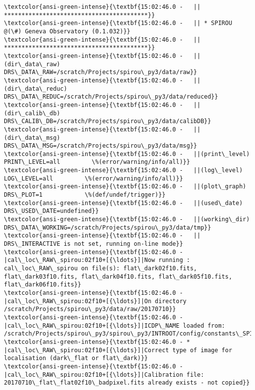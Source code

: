 \documentclass[11pt]{article}
\begin{document}
    \begin{Verbatim}[commandchars=\\\{\}]
\textcolor{ansi-green-intense}{\textbf{15:02:46.0 -   || *****************************************}}
\textcolor{ansi-green-intense}{\textbf{15:02:46.0 -   || * SPIROU @(\#) Geneva Observatory (0.1.032)}}
\textcolor{ansi-green-intense}{\textbf{15:02:46.0 -   || *****************************************}}
\textcolor{ansi-green-intense}{\textbf{15:02:46.0 -   ||(dir\_data\_raw)      DRS\_DATA\_RAW=/scratch/Projects/spirou\_py3/data/raw}}
\textcolor{ansi-green-intense}{\textbf{15:02:46.0 -   ||(dir\_data\_reduc)    DRS\_DATA\_REDUC=/scratch/Projects/spirou\_py3/data/reduced}}
\textcolor{ansi-green-intense}{\textbf{15:02:46.0 -   ||(dir\_calib\_db)      DRS\_CALIB\_DB=/scratch/Projects/spirou\_py3/data/calibDB}}
\textcolor{ansi-green-intense}{\textbf{15:02:46.0 -   ||(dir\_data\_msg)      DRS\_DATA\_MSG=/scratch/Projects/spirou\_py3/data/msg}}
\textcolor{ansi-green-intense}{\textbf{15:02:46.0 -   ||(print\_level)       PRINT\_LEVEL=all         \%(error/warning/info/all)}}
\textcolor{ansi-green-intense}{\textbf{15:02:46.0 -   ||(log\_level)         LOG\_LEVEL=all         \%(error/warning/info/all)}}
\textcolor{ansi-green-intense}{\textbf{15:02:46.0 -   ||(plot\_graph)        DRS\_PLOT=1            \%(def/undef/trigger)}}
\textcolor{ansi-green-intense}{\textbf{15:02:46.0 -   ||(used\_date)         DRS\_USED\_DATE=undefined}}
\textcolor{ansi-green-intense}{\textbf{15:02:46.0 -   ||(working\_dir)       DRS\_DATA\_WORKING=/scratch/Projects/spirou\_py3/data/tmp}}
\textcolor{ansi-green-intense}{\textbf{15:02:46.0 -   ||                    DRS\_INTERACTIVE is not set, running on-line mode}}
\textcolor{ansi-green-intense}{\textbf{15:02:46.0 -   |cal\_loc\_RAW\_spirou:02f10+[{\ldots}]|Now running : cal\_loc\_RAW\_spirou on file(s): flat\_dark02f10.fits, flat\_dark03f10.fits, flat\_dark04f10.fits, flat\_dark05f10.fits, flat\_dark06f10.fits}}
\textcolor{ansi-green-intense}{\textbf{15:02:46.0 -   |cal\_loc\_RAW\_spirou:02f10+[{\ldots}]|On directory /scratch/Projects/spirou\_py3/data/raw/20170710}}
\textcolor{ansi-green-intense}{\textbf{15:02:46.0 -   |cal\_loc\_RAW\_spirou:02f10+[{\ldots}]|ICDP\_NAME loaded from: /scratch/Projects/spirou\_py3/spirou\_py3/INTROOT/config/constants\_SPIROU.py}}
\textcolor{ansi-green-intense}{\textbf{15:02:46.0 - * |cal\_loc\_RAW\_spirou:02f10+[{\ldots}]|Correct type of image for localisation (dark\_flat or flat\_dark)}}
\textcolor{ansi-green-intense}{\textbf{15:02:46.0 -   |cal\_loc\_RAW\_spirou:02f10+[{\ldots}]|Calibration file: 20170710\_flat\_flat02f10\_badpixel.fits already exists - not copied}}

\end{Verbatim}
\end{document}

